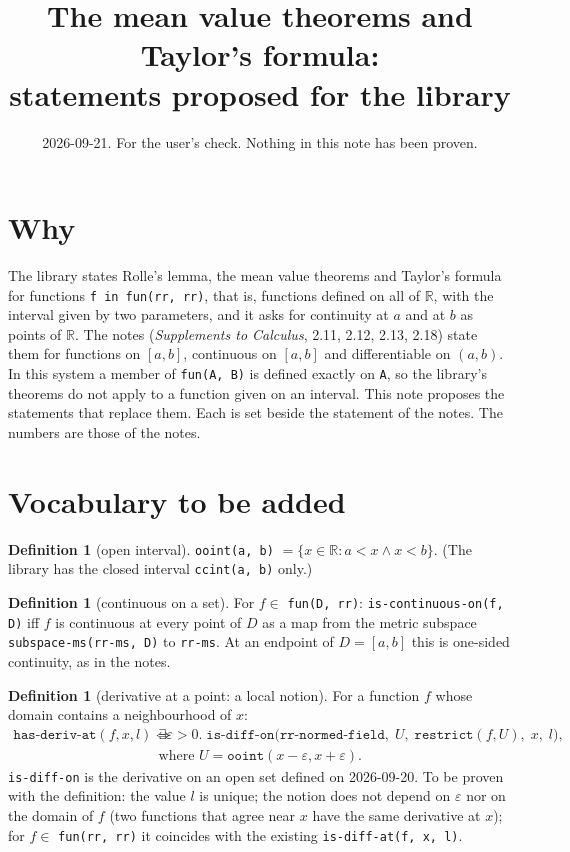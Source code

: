 \documentclass[11pt]{article}
\title{The mean value theorems and Taylor's formula:\\ statements proposed for the library}
\author{}
\date{2026-09-21. For the user's check. Nothing in this note has been proven.}
\theoremstyle{definition}
\newtheorem{dfn}[thm]{Definition}
\newcommand{\vnb}[1]{\texttt{#1}}
\begin{document}
\maketitle

\section{Why}

The library states Rolle's lemma, the mean value theorems and Taylor's formula for functions
\vnb{f in fun(rr, rr)}, that is, functions defined on all of $\mathbb{R}$, with the interval given by
two parameters, and it asks for continuity at $a$ and at $b$ as points of $\mathbb{R}$. The notes
(\emph{Supplements to Calculus}, 2.11, 2.12, 2.13, 2.18) state them for functions on $[a,b]$,
continuous on $[a,b]$ and differentiable on $(a,b)$. In this system a member of \vnb{fun(A, B)} is
defined exactly on \vnb{A}, so the library's theorems do not apply to a function given on an
interval. This note proposes the statements that replace them. Each is set beside the statement
of the notes. The numbers are those of the notes.

\section{Vocabulary to be added}

\begin{dfn}[open interval]
\vnb{ooint(a, b)} $= \{x \in \mathbb{R} : a < x \wedge x < b\}$. (The library has the closed
interval \vnb{ccint(a, b)} only.)
\end{dfn}

\begin{dfn}[continuous on a set]
For $f \in$ \vnb{fun(D, rr)}: \vnb{is-continuous-on(f, D)} iff $f$ is continuous at every point of
$D$ as a map from the metric subspace \vnb{subspace-ms(rr-ms, D)} to \vnb{rr-ms}. At an endpoint of
$D = [a,b]$ this is one-sided continuity, as in the notes.
\end{dfn}

\begin{dfn}[derivative at a point: a local notion]
For a function $f$ whose domain contains a neighbourhood of $x$:
\begin{align*}
\vnb{has-deriv-at}(f, x, l) \iff{} & \exists \varepsilon > 0.\;
\vnb{is-diff-on}\bigl(\vnb{rr-normed-field},\; U,\; \vnb{restrict}(f, U),\; x,\; l\bigr),\\
& \text{where } U = \vnb{ooint}(x - \varepsilon, x + \varepsilon).
\end{align*}
\vnb{is-diff-on} is the derivative on an open set defined on 2026-09-20. To be proven with the
definition: the value $l$ is unique; the notion does not depend on $\varepsilon$ nor on the domain of
$f$ (two functions that agree near $x$ have the same derivative at $x$); for $f \in$ \vnb{fun(rr, rr)}
it coincides with the existing \vnb{is-diff-at(f, x, l)}.
\end{dfn}
\end{document}
